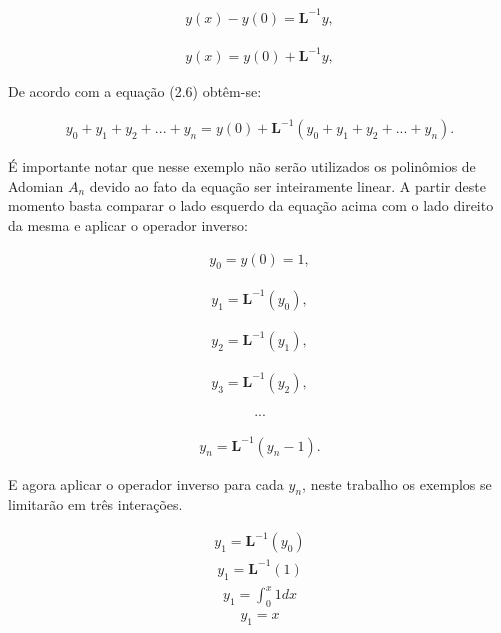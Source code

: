  \begin{gather*}
  y(x) - y(0) = \textbf{L}^{-1} y,
\end{gather*} 

 \begin{gather*}
  y(x) = y(0) + \textbf{L}^{-1} y,
\end{gather*} 
 
 De acordo com a equação (2.6) obtêm-se:
 
  \begin{gather*}
  y_{0} +y_{1} + y_{2} + ... + y_{n}  = y(0) + \textbf{L}^{-1}( y_{0} +y_{1} + y_{2} + ... + y_{n}).
\end{gather*}

É importante notar que nesse exemplo não serão utilizados os polinômios de Adomian $A_{n}$  devido ao fato da equação ser inteiramente linear.
A partir deste momento basta comparar o lado esquerdo da equação acima com o lado direito da mesma e aplicar o operador inverso:

\begin{gather*}
  y_{0} = y(0) = 1,
\end{gather*}

\begin{gather*}
  y_{1} = \textbf{L}^{-1} (y_{0}),
\end{gather*}

\begin{gather*}
  y_{2} = \textbf{L}^{-1} (y_{1}),
\end{gather*}

\begin{gather*}
  y_{3} = \textbf{L}^{-1} (y_{2}),
\end{gather*}

\begin{gather*}
  ...
\end{gather*}

 \begin{gather*}
  y_{n} = \textbf{L}^{-1} (y_{n} - 1).
\end{gather*}

E agora aplicar o operador inverso para cada $y_{n}$, neste trabalho os exemplos se limitarão em três interações. 

\begin{gather*}
  y_{1} = \textbf{L}^{-1} (y_{0})
\end{gather*}
\begin{gather*}
  y_{1} = \textbf{L}^{-1}(1)
\end{gather*}
\begin{gather*}
  y_{1} =\int_0^{x} 1dx
\end{gather*}
\begin{gather*}
  y_{1} = x
\end{gather*}



